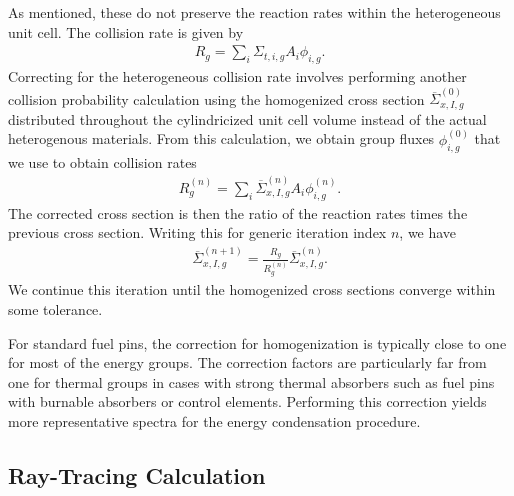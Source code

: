 As mentioned, these do not preserve the reaction rates within the heterogeneous unit cell. The collision rate is given by
\begin{align}
  R_g = \sum_i \Sigma_{t,i,g} A_i \phi_{i,g} .
\end{align}
Correcting for the heterogeneous collision rate involves performing another collision probability calculation using the homogenized cross section $\overline{\Sigma}_{x,I,g}^{(0)}$ distributed throughout the cylindricized unit cell volume instead of the actual heterogenous materials. From this calculation, we obtain group fluxes $\phi^{(0)}_{i,g}$ that we use to obtain collision rates
\begin{align}
  R_g^{(n)} = \sum_i \overline{\Sigma}_{x,I,g}^{(n)} A_i \phi_{i,g}^{(n)} .
\end{align}
The corrected cross section is then the ratio of the reaction rates times the previous cross section. Writing this for generic iteration index $n$, we have
\begin{align}
   \overline{\Sigma}_{x,I,g}^{(n+1)} = \frac{ R_g }{ R_g^{(n)} } \overline{\Sigma}_{x,I,g}^{(n)} .
\end{align}
We continue this iteration until the homogenized cross sections converge within some tolerance.

For standard fuel pins, the correction for homogenization is typically close to one for most of the energy groups. The correction factors are particularly far from one for thermal groups in cases with strong thermal absorbers such as fuel pins with burnable absorbers or control elements. Performing this correction yields more representative spectra for the energy condensation procedure.




\subsection{Ray-Tracing Calculation}

